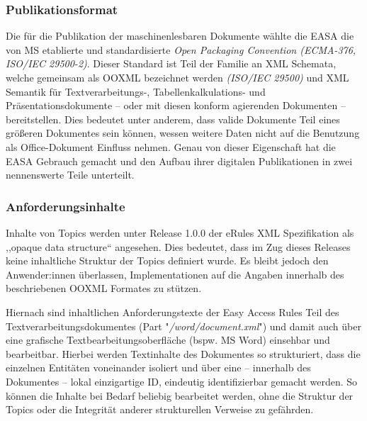         
        \subsubsection{Publikationsformat}

            Die für die Publikation der maschinenlesbaren Dokumente wählte die \ac{EASA} die von \acf{MS} etablierte und standardisierte \textit{Open Packaging Convention (ECMA-376, ISO/IEC 29500-2)}.
            Dieser Standard ist Teil der Familie an \ac{XML} Schemata, welche gemeinsam als \acf{OOXML} bezeichnet werden \textit{(ISO/IEC 29500)} und \ac{XML} Semantik für Textverarbeitungs-, Tabellen\-kal\-ku\-lations- und Präsentationsdokumente -- oder mit diesen konform agierenden Dokumenten -- bereitstellen. 
            \cite[vii]{easa_opc_iso} 
            Dies bedeutet unter anderem, dass valide Dokumente Teil eines größeren Dokumentes sein können, wessen weitere Daten nicht auf die Benutzung als Office-Dokument Einfluss nehmen.
            Genau von dieser Eigenschaft hat die \ac{EASA} Gebrauch gemacht und den Aufbau ihrer digitalen Publikationen in zwei nennenswerte Teile unterteilt.   

            \subsubsection{Anforderungsinhalte}

    Inhalte von Topics werden unter Release 1.0.0 der eRules \ac{XML} Spezifikation als ,,opaque data structure`` angesehen.
    Dies bedeutet, dass im Zug dieses Releases keine inhaltliche Struktur der Topics definiert wurde.
    Es bleibt jedoch den Anwender:innen überlassen, Implementationen auf die Angaben innerhalb des beschriebenen \acs{OOXML} Formates zu stützen.
    \cite[6]{easa_xml_doc}

            Hiernach sind inhaltlichen Anforderungstexte der Easy Access Rules Teil des Textverarbeitungsdokumentes (Part "\textit{/word/document.xml}") und damit auch über eine grafische Textbearbeitungsoberfläche (bspw. \ac{MS} Word) einsehbar und bearbeitbar.
            Hierbei werden Textinhalte des Dokumentes so strukturiert, dass die einzelnen Entitäten voneinander isoliert und über eine -- innerhalb des Dokumentes -- lokal einzigartige ID, eindeutig identifizierbar gemacht werden.
            So können die Inhalte bei Bedarf beliebig bearbeitet werden, ohne die Struktur der Topics oder die Integrität anderer strukturellen Verweise zu gefährden.

